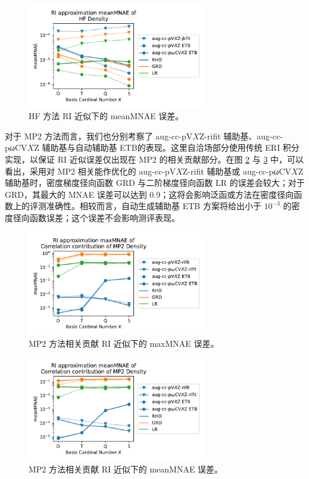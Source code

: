 \begin{figure}[t]
  \centering
  \includegraphics[width=0.7\textwidth]{assets/HF-RI-mean.pdf}
  \caption[HF 方法 RI 近似下的 meanMNAE 误差]{HF 方法 RI 近似下的 meanMNAE 误差。}
  \label{fig.4.HF-RI-mean}
\end{figure}

对于 MP2 方法而言，我们也分别考察了 aug-cc-pV$X$Z-rifit 辅助基、aug-cc-pωCV$X$Z 辅助基与自动辅助基 ETB的表现。这里自洽场部分使用传统 ERI 积分实现，以保证 RI 近似误差仅出现在 MP2 的相关贡献部分。在图 \ref{fig.4.MP2-RI-err} 与 \ref{fig.4.MP2-RI-mean} 中，可以看出，采用对 MP2 相关能作优化的 aug-cc-pV$X$Z-rifit 辅助基或 aug-cc-pωCV$X$Z 辅助基时，密度梯度径向函数 GRD 与二阶梯度径向函数 LR 的误差会较大；对于 GRD，其最大的 MNAE 误差可以达到 0.9；这将会影响泛函或方法在密度径向函数上的评测准确性。相较而言，自动生成辅助基 ETB 方案将给出小于 $10^{-3}$ 的密度径向函数误差；这个误差不会影响测评表现。

\begin{figure}[t]
  \centering
  \includegraphics[width=0.7\textwidth]{assets/MP2-RI-err.pdf}
  \caption[MP2 方法相关贡献 RI 近似下的 maxMNAE 误差]{MP2 方法相关贡献 RI 近似下的 maxMNAE 误差。}
  \label{fig.4.MP2-RI-err}
\end{figure}

\begin{figure}[t]
  \centering
  \includegraphics[width=0.7\textwidth]{assets/MP2-RI-mean.pdf}
  \caption[MP2 方法相关贡献 RI 近似下的 meanMNAE 误差]{MP2 方法相关贡献 RI 近似下的 meanMNAE 误差。}
  \label{fig.4.MP2-RI-mean}
\end{figure}

